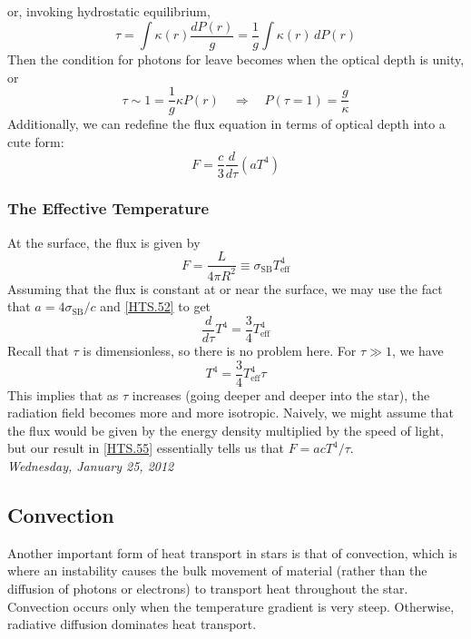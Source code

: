 \documentclass[10pt]{article}
\numberwithin{equation}{section}
\newcommand{\n}{\noindent}
\begin{document}
	or, invoking hydrostatic equilibrium,
	\begin{equation}
		\label{HTS.50} \tau=\int \kappa(r)\frac{dP(r)}{g}=\frac{1}{g}\int \kappa(r)\,dP(r)
	\end{equation}
	Then the condition for photons for leave becomes when the optical depth is unity, or
	\begin{equation}
		\label{HTS.51} \tau\sim1=\frac{1}{g}\kappa P(r)\quad\Rightarrow\quad P(\tau=1)=\frac{g}{\kappa}
	\end{equation}
	Additionally, we can redefine the flux equation in terms of optical depth into a cute form:
	\begin{equation}
		\label{HTS.52} F=\frac{c}{3}\frac{d}{d\tau}\left(aT^4\right)
	\end{equation}
	\subsubsection{The Effective Temperature}
	At the surface, the flux is given by
	\begin{equation}
		\label{HTS.53} F=\frac{L}{4\pi R^2}\equiv \sigma_{\mathrm{SB}}T_{\mathrm{eff}}^4
	\end{equation}
	Assuming that the flux is constant at or near the surface, we may use the fact that $a=4\sigma_{\mathrm{SB}}/c$ and \eqref{HTS.52} to get
	\begin{equation}
		\label{HTS.54} \frac{d}{d\tau}T^4=\frac{3}{4}T_{\mathrm{eff}}^4
	\end{equation}
	Recall that $\tau$ is dimensionless, so there is no problem here. For $\tau\gg 1$, we have
	\begin{equation}
		\label{HTS.55} T^4=\frac{3}{4}T_{\mathrm{eff}}^4\tau
	\end{equation}
	This implies that as $\tau$ increases (going deeper and deeper
        into the star), the radiation field becomes more and more
        isotropic. Naively, we might assume that the flux would be
        given by the energy density multiplied by the speed of light,
        but our result in \eqref{HTS.55} essentially tells us that
        $F=acT^4/\tau$.\\

        \n \textit{Wednesday, January 25, 2012}
\subsection{Convection}
\label{sec:conv}
Another important form of heat transport in stars is that of
convection, which is where an instability causes the bulk movement of
material (rather than the diffusion of photons or electrons) to
transport heat throughout the star. Convection occurs only when the
temperature gradient is very steep. Otherwise, radiative diffusion
dominates heat transport.\\
\end{document}
